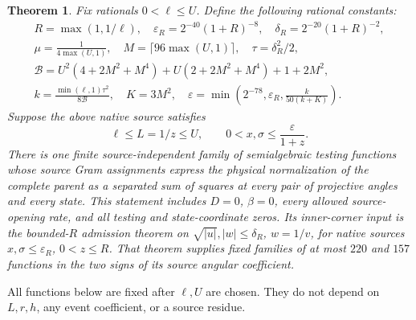 \documentclass[11pt]{article}
\newtheorem{theorem}{Theorem}
\begin{document}
\begin{theorem}\label{thm:bounded-unit}
Fix rationals $0<\ell\le U$. Define the following rational constants:
\begin{gather*}
 R=\max(1,1/\ell),\quad
 \varepsilon_R=2^{-40}(1+R)^{-8},\quad
 \delta_R=2^{-20}(1+R)^{-2},\\
 \mu=\frac1{4\max(U,1)},\quad
 M=\lceil96\max(U,1)\rceil,\quad\tau=\delta_R^2/2,\\
 \mathcal B=U^2(4+2M^2+M^4)+U(2+2M^2+M^4)+1+2M^2,\\
 k=\frac{\min(\ell,1)\tau^2}{8\mathcal B},\quad K=3M^2,\quad
 \varepsilon=\min\left(2^{-78},\varepsilon_R,
                                  \frac{k}{50(k+K)}\right).
\end{gather*}
Suppose the above native source satisfies
\[
 \ell\le L=1/z\le U,\qquad
 0<x,\sigma\le\frac\varepsilon{1+z}.
\]
There is one finite source-independent family of semialgebraic testing
functions whose source Gram assignments express the physical normalization of the complete parent
as a separated sum of squares at every pair of projective angles and
every state. This statement includes $D=0$, $\beta=0$, every allowed
source-opening rate, and all testing and state-coordinate zeros.
Its inner-corner input is the bounded-$R$ admission theorem on
$\sqrt{|u|},|w|\le\delta_R$, $w=1/v$, for native sources
$x,\sigma\le\varepsilon_R$, $0<z\le R$.
That theorem supplies fixed families of at most $220$ and $157$
functions in the two signs of its source angular coefficient.
\end{theorem}

All functions below are fixed after $\ell,U$ are chosen. They do not depend
on $L,r,h$, any event coefficient, or a source residue.
\end{document}
